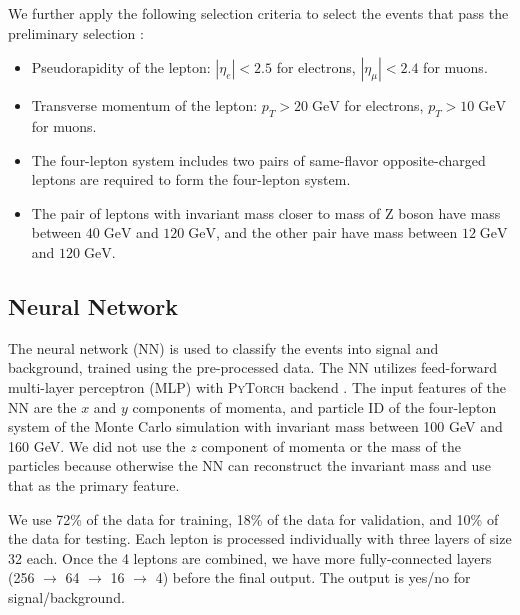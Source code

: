 We further apply the following selection criteria to select the events that pass the preliminary selection \cite{CMS:2012qbp}:
\begin{itemize}
  \item Pseudorapidity of the lepton: $|\eta_e| < 2.5$ for electrons, $|\eta_\mu| < 2.4$ for muons.
  \item Transverse momentum of the lepton: $p_T > 20\;\text{GeV}$ for electrons, $p_T > 10\;\text{GeV}$ for muons.
  \item The four-lepton system includes two pairs of same-flavor opposite-charged leptons are required to form the four-lepton system. 
  \item The pair of leptons with invariant mass closer to mass of Z boson have mass between $40\;\text{GeV}$ and $120\;\text{GeV}$, and the other pair have mass between $12\;\text{GeV}$ and $120\;\text{GeV}$.
\end{itemize}

\subsection{Neural Network}
The neural network (NN) is used to classify the events into signal and background, trained using the pre-processed data. The NN utilizes feed-forward multi-layer perceptron (MLP) \cite{rumelhart1986learning} with \textsc{PyTorch} backend \cite{paszke2019pytorch}. The input features of the NN are the $x$ and $y$ components of momenta, and particle ID of the four-lepton system of the Monte Carlo simulation with invariant mass between 100 GeV and 160 GeV. We did not use the $z$ component of momenta or the mass of the particles because otherwise the NN can reconstruct the invariant mass and use that as the primary feature. 

We use 72\% of the data for training, 18\% of the data for validation, and 10\% of the data for testing. Each lepton is processed individually with three layers of size 32 each. Once the 4 leptons are combined, we have more fully-connected layers (256 $\to$ 64 $\to$ 16 $\to$ 4) before the final output. The output is yes/no for signal/background. 


